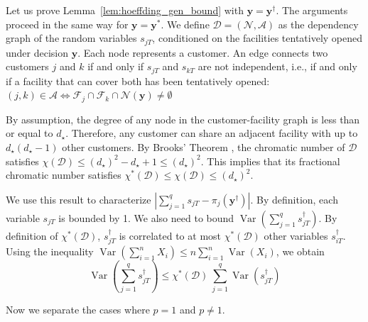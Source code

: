 \documentclass[nonblindrev]{informs3noheader}
\DeclareMathOperator{\Var}{Var}
\def\calA{\mathcal{A}}
\def\calD{\mathcal{D}}
\def\calF{\mathcal{F}}
\def\calN{\mathcal{N}}
\def\by{\boldsymbol{y}}
\begin{document}
Let us prove Lemma~\ref{lem:hoeffding_gen_bound} with $\by = \by^\dagger$. The arguments proceed in the same way for $\by = \by^*$. We define $\calD=(\calN,\calA)$ as the dependency graph of the random variables $s_{jT}$, conditioned on the facilities tentatively opened under decision $\by$. Each node represents a customer. An edge connects two customers $j$ and $k$ if and only if $s_{jT}$ and $s_{kT}$ are not independent, i.e., if and only if a facility that can cover both has been tentatively opened: $(j,k)\in\calA\iff\calF_j\cap\calF_k\cap\calN(\by)\neq\emptyset$

By assumption, the degree of any node in the customer-facility graph is less than or equal to $d_\star$. Therefore, any customer can share an adjacent facility with up to $d_\star(d_\star-1)$ other customers.
By Brooks' Theorem \citep{brooks1941colouring}, the chromatic number of $\calD$ satisfies $\chi(\calD)\leq (d_\star)^2-d_\star+1\leq (d_\star)^2$. This implies that its fractional chromatic number satisfies $\chi^*(\calD)\leq \chi(\calD)\leq (d_\star)^2$.

We use this result to characterize $\left|\sum_{j=1}^q s_{jT} - \pi_{j}(\by^\dagger)\right|$. By definition, each variable $s_{jT}$ is bounded by 1. We also need to bound $\Var\left(\sum_{j=1}^q s^\dagger_{jT}\right)$. By definition of $\chi^*(\calD)$, $s^\dagger_{jT}$ is correlated to at most $\chi^*(\calD)$ other variables $s^\dagger_{iT}$. Using the inequality $\Var(\sum_{i=1}^n X_i)\leq n \sum_{i=1}^n \Var(X_i)$, we obtain
\[\Var\left(\sum_{j=1}^q s^\dagger_{jT}\right) \leq  \chi^*(\calD)\ \sum_{j=1}^q \Var(s^\dagger_{jT})\]

Now we separate the cases where $p=1$ and $p\neq 1$.
\end{document}
